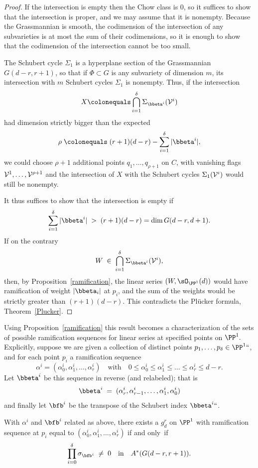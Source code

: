 \begin{proof}
If the intersection is empty then the Chow class is 0, so it suffices
to show that the intersection is proper,
and we may assume that it is nonempty. Because the Grassmannian is smooth,
the codimension of the intersection of any subvarieties
 is at most the sum of their codimensions, so it is enough to show that
 the codimension of the
 intersection cannot be too small.

The Schubert cycle $\Sigma_1$ is a hyperplane section of the Grassmannian
$G(d-r, r+1)$, so that if $\Phi \subset G$ is any subvariety of
dimension $m$, its intersection with $m$ Schubert cycles $\Sigma_1$
is nonempty. Thus, if the intersection
$$
X \colonequals  \bigcap_{i=1}^\delta \Sigma_{{\bbeta}^i}({\cal V}^i)
$$
had dimension strictly bigger than the expected
$$
\rho \; \colonequals  \; (r+1)(d-r) - \sum_{i=1}^\delta |{\bbeta}^i|,
$$
we could choose $\rho + 1$ additional points $q_1,\dots,q_{\rho + 1}$
on $C$, with vanishing flags ${\cal V}^1, \dots, {\cal V}^{\rho + 1}$
and the intersection of $X$ with the Schubert cycles $\Sigma_1({\cal
V}^i)$ would still be nonempty.

It thus suffices to show that the intersection is empty if
$$
\sum_{i=1}^\delta |{\bbeta}^i| \; > \; (r+1)(d-r) = \dim G(d-r, d+1).
$$
If on the contrary
$$
W \; \in \; \bigcap_{i=1}^\delta \Sigma_{{\bbeta}^i}({\cal V}^i),
$$
then, by Proposition~\ref{ramification}, the linear series $(W,
\sO_{\PP^{1}}(d))$  would have
ramification of weight $|{\bbeta_i}|$ at $p_i$, and the sum of the
weights would be strictly greater than $(r+1)(d-r)$.
This contradicts the Pl\"ucker formula, Theorem~\ref{Plucker}.
\end{proof}

Using Proposition~\ref{ramification} this result becomes a
characterization of the sets of possible ramification
sequences for linear series at specified points on $\PP^1.$
 Explicitly, suppose we are given a collection of distinct points
 $p_1,\dots,p_\delta \in \PP^1` `$, and for each point $p_i$ a
 ramification sequence
$$
\alpha^i = (\alpha^i_0, \alpha^i_1, \dots, \alpha^i_r) \quad \text{with}
\quad 0 \leq \alpha^i_0 \leq \alpha^i_1 \leq \dots \leq \alpha^i_r
\leq d-r.
$$
Let ${\bbeta}^i$ be this sequence in reverse (and relabeled); that is
$$
{\bbeta}^i \; = \; (\alpha^i_r, \alpha^i_{r-1}, \dots, \alpha^i_1,
\alpha^i_0)
$$
and finally let $\bfb^i$ be the transpose of the Schubert index
${\bbeta}^i` `$.

\begin{corollary}
With $\alpha^i $ and $\bfb^i$ related as above,  there exists a
$g^r_d$ on $\PP^1$ with ramification sequence at $p_i$ equal to
$(\alpha^i_0, \alpha^i_1, \dots, \alpha^i_r)$ if and only~if
$$
\prod_{i=0}^\delta  \sigma_{\bfb^i} \; \neq \; 0 \quad \text{in} \quad
A^*(G(d-r, r+1)).
$$
\end{corollary}

